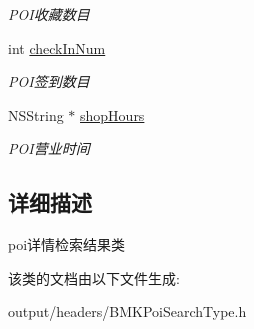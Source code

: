 \begin{DoxyCompactItemize}
\begin{DoxyCompactList}\small\item\em P\+O\+I收藏数目 \end{DoxyCompactList}\item 
\hypertarget{interface_b_m_k_poi_detail_result_aeb7c140cbab374cb4a1171d9b0110e47}{}int \hyperlink{interface_b_m_k_poi_detail_result_aeb7c140cbab374cb4a1171d9b0110e47}{check\+In\+Num}\label{interface_b_m_k_poi_detail_result_aeb7c140cbab374cb4a1171d9b0110e47}

\begin{DoxyCompactList}\small\item\em P\+O\+I签到数目 \end{DoxyCompactList}\item 
\hypertarget{interface_b_m_k_poi_detail_result_abc1d7ae185ffba432cf72148c9a896dd}{}N\+S\+String $\ast$ \hyperlink{interface_b_m_k_poi_detail_result_abc1d7ae185ffba432cf72148c9a896dd}{shop\+Hours}\label{interface_b_m_k_poi_detail_result_abc1d7ae185ffba432cf72148c9a896dd}

\begin{DoxyCompactList}\small\item\em P\+O\+I营业时间 \end{DoxyCompactList}\end{DoxyCompactItemize}


\subsection{详细描述}
poi详情检索结果类 

该类的文档由以下文件生成\+:\begin{DoxyCompactItemize}
\item 
output/headers/B\+M\+K\+Poi\+Search\+Type.\+h\end{DoxyCompactItemize}
